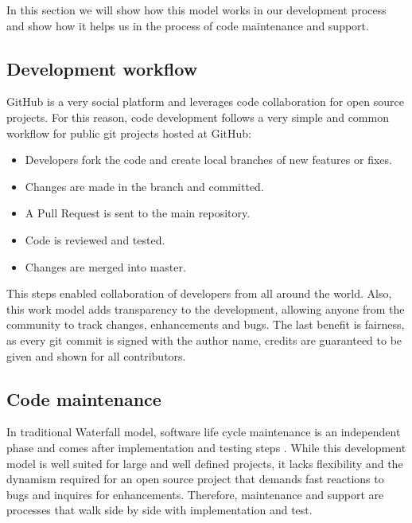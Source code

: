 In this section we will show how this model works in our development process and show how it helps us in the process of code maintenance and support.    

\subsection{Development workflow}

GitHub is a very social platform and leverages code collaboration for open source projects. For this reason, code development follows a very simple and common workflow for public git projects hosted at GitHub:

\begin{itemize}

\item Developers fork the code and create local branches of new features or fixes. 

\item Changes are made in the branch and committed.

\item A Pull Request is sent to the main repository.  

\item Code is reviewed and tested. 

\item Changes are merged into master.

\end{itemize}

This steps enabled collaboration of developers from all around the world. Also, this work model adds transparency to the development, allowing anyone from the community to track changes, enhancements and bugs. The last benefit is fairness, as every git commit is signed with the author name, credits are guaranteed to be given and shown for all contributors.          

\subsection{Code maintenance}
\label{CodeMaintenance}

In traditional Waterfall model, software life cycle maintenance is an independent phase and comes after implementation and testing steps \cite{Ruparelia:2010:SDL:1764810.1764814}. While this development model is well suited for large and well defined projects, it lacks flexibility and the dynamism required for an open source project that demands fast reactions to bugs and inquires for enhancements. Therefore, maintenance and support are processes that walk side by side with implementation and test. 

